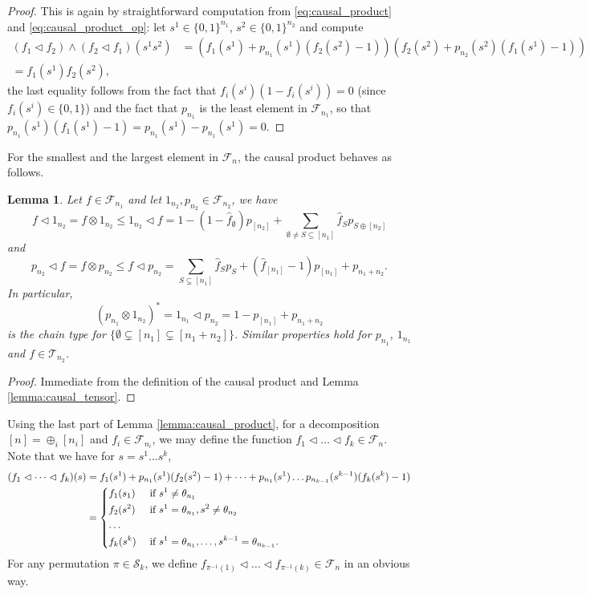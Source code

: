 \documentclass[12pt]{article}
\newtheorem{lemma}{Lemma}
\theoremstyle{definition}
\theoremstyle{remark}
\def\Te{\mathcal T}
\def\Fe{\mathcal F}
\def\permut{\mathscr{S}}
\def\vtl{\vartriangleleft}
\begin{document}
\begin{proof} This is again by straightforward computation from \eqref{eq:causal_product}
and \eqref{eq:causal_product_op}: let
$s^1\in \{0,1\}^{n_1}$, $s^2\in \{0,1\}^{n_2}$ and compute
\begin{align*}
(f_1\vtl f_2)\wedge (f_2\vtl
f_1)(s^1s^2)&=\left(f_1(s^1)+p_{n_1}(s^1)(f_2(s^2)-1)\right)\left(f_2(s^2)+p_{n_2}(s^2)(f_1(s^1)-1)\right)\\
=f_1(s^1)f_2(s^2),
\end{align*}
the last equality follows from the fact that $f_i(s^i)(1-f_i(s^i))=0$ (since $f_i(s^i)\in
\{0,1\}$) and the fact that $p_{n_1}$ is the least element in $\Fe_{n_1}$, so that
$p_{n_1}(s^1)(f_1(s^1)-1)=p_{n_1}(s^1)-p_{n_1}(s^1)=0$. 

\end{proof}

For the smallest and the largest element in $\Fe_n$, the causal product behaves as
follows.
\begin{lemma}\label{lemma:onechain_causal}
Let  $f\in \Fe_{n_1}$ and let $1_{n_2}, p_{n_2}\in \Fe_{n_2}$, we have
\[
f\vtl 1_{n_2}= f\otimes 1_{n_2}\le 1_{n_2}\vtl f =1-(1-\hat
f_\emptyset)p_{[n_2]}+\sum_{\emptyset \ne S\subseteq [n_1]} \hat f_S p_{S\oplus [n_2]}
\]
and
\[
p_{n_2} \vtl f= f \otimes p_{n_2}\le f\vtl p_{n_2}=\sum_{S\subsetneq [n_1]} \hat
f_Sp_S+(\hat f_{[n_1]}-1)p_{[n_1]}+p_{n_1+n_2}.
\]
In particular,
\[
(p_{n_1}\otimes 1_{n_2})^*=1_{n_1}\vtl p_{n_2}=1-p_{[n_1]}+p_{n_1+n_2}
\]
is the chain type for $\{\emptyset\subsetneq [n_1]\subsetneq [n_1+n_2]\}$. Similar
properties hold for $p_{n_1}$, $1_{n_1}$ and $f\in \Te_{n_2}$.
\end{lemma}

\begin{proof}
Immediate from the definition of the causal product and Lemma \ref{lemma:causal_tensor}.

\end{proof}







Using the last part of Lemma \ref{lemma:causal_product},
for a decomposition $[n]=\oplus_i[n_i]$ and $f_i\in \Fe_{n_i}$,  we may define the function $f_1\vtl\dots \vtl f_k\in
\Fe_{n}$. Note that we have for $s=s^1\dots s^k$, 
\begin{align*}
(f_1\vtl \dots\vtl f_k)(s)&=f_1(s^1)+p_{n_1}(s^1)(f_2(s^2)-1)+\dots + p_{n_1}(s^1)\dots
p_{n_{k-1}}(s^{k-1})(f_k(s^k)-1)\\
&= \begin{dcases} f_1(s_1) & \text{ if } s^1\ne \theta_{n_1}\\
f_2(s^2) & \text{ if } s^1=\theta_{n_1}, s^2\ne \theta_{n_2}\\
\dots & \\
f_k(s^k) & \text{ if } s^1=\theta_{n_1},\dots,  s^{k-1}=\theta_{n_{k-1}}.
\end{dcases}
\end{align*}
For any permutation $\pi\in \permut_k$, we define  $f_{\pi^{-1}(1)}\vtl \dots \vtl
f_{\pi^{-1}(k)}\in \Fe_n$ in an obvious way.
\end{document}
